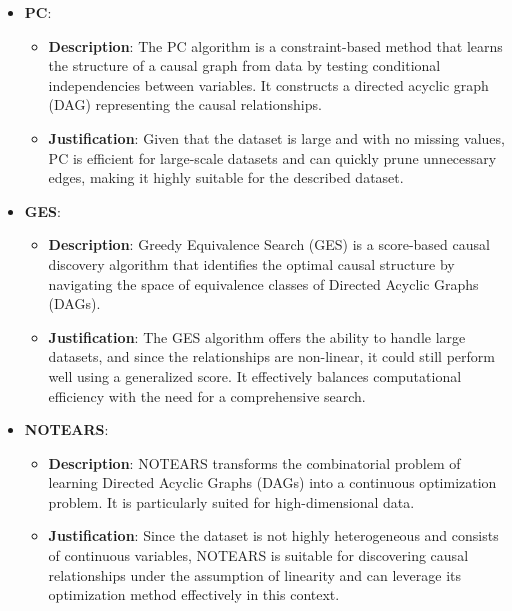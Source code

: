 \documentclass{article}
\begin{document}
\begin{itemize}

\item \textbf{PC}:
\begin{itemize}
    \item \textbf{Description}: The PC algorithm is a constraint-based method that learns the structure of a causal graph from data by testing conditional independencies between variables. It constructs a directed acyclic graph (DAG) representing the causal relationships.
    \item \textbf{Justification}: Given that the dataset is large and with no missing values, PC is efficient for large-scale datasets and can quickly prune unnecessary edges, making it highly suitable for the described dataset.
\end{itemize}

\item \textbf{GES}:
\begin{itemize}
    \item \textbf{Description}: Greedy Equivalence Search (GES) is a score-based causal discovery algorithm that identifies the optimal causal structure by navigating the space of equivalence classes of Directed Acyclic Graphs (DAGs).
    \item \textbf{Justification}: The GES algorithm offers the ability to handle large datasets, and since the relationships are non-linear, it could still perform well using a generalized score. It effectively balances computational efficiency with the need for a comprehensive search.
\end{itemize}

\item \textbf{NOTEARS}:
\begin{itemize}
    \item \textbf{Description}: NOTEARS transforms the combinatorial problem of learning Directed Acyclic Graphs (DAGs) into a continuous optimization problem. It is particularly suited for high-dimensional data.
    \item \textbf{Justification}: Since the dataset is not highly heterogeneous and consists of continuous variables, NOTEARS is suitable for discovering causal relationships under the assumption of linearity and can leverage its optimization method effectively in this context.
\end{itemize}

\end{itemize}
                    
\end{document}

